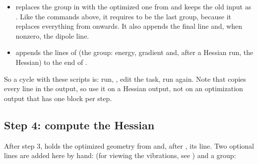 \documentclass[letterpaper,10pt,english,openany,oneside]{sphinxmanual}
\begin{document}
\begin{itemize}
\item {} 
\sphinxAtStartPar
{} replaces the  group in  with the optimized one from  and keeps the old input as
. Like the commands above, it requires  to be the last group, because it replaces everything from
 onwards. It also appends the final  line and, when non\sphinxhyphen{}zero, the dipole line.

\item {} 
\sphinxAtStartPar
{} appends the  lines of  (the  group: energy, gradient and, after a Hessian run, the
Hessian) to the end of .

\end{itemize}

\sphinxAtStartPar
So a cycle with these scripts is: run, , edit the task, run again. Note that  copies every  line in the
output, so use it on a Hessian output, not on an optimization output that has one block per step.




\subsection{Step 4: compute the Hessian}
\label{\detokenize{start/getting-started:step-4-compute-the-hessian}}
\sphinxAtStartPar
After step 3,  holds the optimized geometry from  and, after , its  line. Two
optional lines are added here by hand:  (for viewing the vibrations, see {\hyperref[\detokenize{start/getting-started:qs-molden}]{}}) and a
 group:
\end{document}
